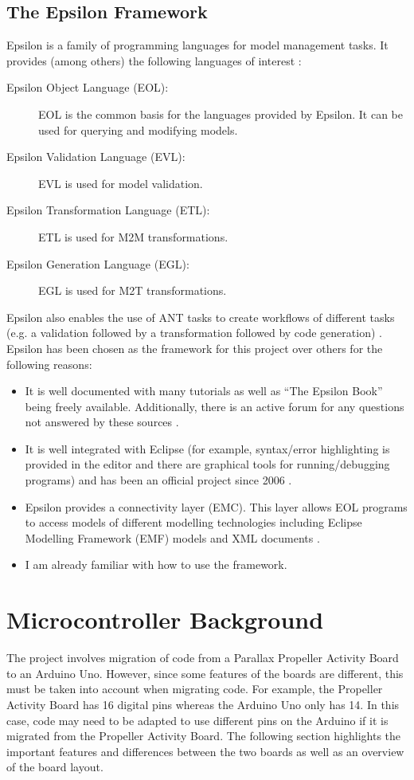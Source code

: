 \documentclass{UoYCSproject}
\begin{document}
\subsection{The Epsilon Framework}
Epsilon is a family of programming languages for model management tasks. It provides (among others) the following languages of interest \parencite{kolovos2010epsilon}:
\begin{description}
\item[Epsilon Object Language (EOL):] EOL is the common basis for the languages provided by Epsilon. It can be used for querying and modifying models.
\item[Epsilon Validation Language (EVL):] EVL is used for model validation.
\item[Epsilon Transformation Language (ETL):] ETL is used for M2M transformations.
\item[Epsilon Generation Language (EGL):] EGL is used for M2T transformations.
\end{description}
Epsilon also enables the use of ANT tasks to create workflows of different tasks (e.g. a validation followed by a
transformation followed by code generation) \parencite{kolovos2010epsilon}.
\newline
Epsilon has been chosen as the framework for this project over others for the following reasons:
\begin{itemize}
\item It is well documented with many tutorials as well as ``The Epsilon Book'' being freely available. Additionally, there is an active forum for any questions not answered by these sources \parencite{epsilonsite}.
\item It is well integrated with Eclipse (for example, syntax/error highlighting is provided in the editor and there are graphical tools for running/debugging programs) and has been an official project since 2006 \parencite{epsilonsite}.
\item Epsilon provides a connectivity layer (EMC). This layer allows EOL programs to access models of different modelling technologies including Eclipse Modelling Framework (EMF) models and XML documents \parencite{epsilonsite}.
\item I am already familiar with how to use the framework.
\end{itemize}

\section{Microcontroller Background} \label{mc_bg}
The project involves migration of code from a Parallax Propeller Activity Board to an Arduino Uno. However, since some features of the boards are different, this must be taken into account when migrating code. For example, the Propeller Activity Board has 16 digital pins whereas the Arduino Uno only has 14. In this case, code may need to be adapted to use different pins on the Arduino if it is migrated from the Propeller Activity Board. The following section highlights the important features and differences between the two boards as well as an overview of the board layout.
\end{document}
